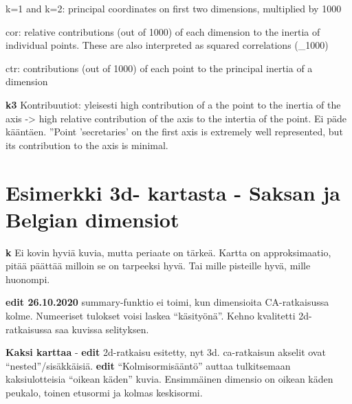 \documentclass[
  finnish,
]{book}
\newenvironment{Shaded}{\begin{snugshade}}{\end{snugshade}}
\newcommand{\CommentTok}[1]{\textcolor[rgb]{0.56,0.35,0.01}{\textit{#1}}}
\newcommand{\DataTypeTok}[1]{\textcolor[rgb]{0.13,0.29,0.53}{#1}}
\newcommand{\DecValTok}[1]{\textcolor[rgb]{0.00,0.00,0.81}{#1}}
\newcommand{\KeywordTok}[1]{\textcolor[rgb]{0.13,0.29,0.53}{\textbf{#1}}}
\newcommand{\NormalTok}[1]{#1}
\newcommand{\OperatorTok}[1]{\textcolor[rgb]{0.81,0.36,0.00}{\textbf{#1}}}
\newcommand{\StringTok}[1]{\textcolor[rgb]{0.31,0.60,0.02}{#1}}
\begin{document}
k=1 and k=2: principal coordinates on first two dimensions, multiplied by 1000

cor: relative contributions (out of 1000) of each dimension to the inertia of
individual points. These are also interpreted as squared correlations (\_1000)

ctr: contributions (out of 1000) of each point to the principal inertia of a dimension

\textbf{k3} Kontribuutiot: yleisesti high contribution of a the point to the inertia of the
axis -\textgreater{} high relative contribution of the axis to the intertia of the point.
Ei päde kääntäen. ''Point 'secretaries' on the first axis is extremely
well represented, but its contribution to the axis is minimal.

\hypertarget{esimerkki-3d--kartasta---saksan-ja-belgian-dimensiot}{%
\section{Esimerkki 3d- kartasta - Saksan ja Belgian dimensiot}\label{esimerkki-3d--kartasta---saksan-ja-belgian-dimensiot}}

\textbf{k} Ei kovin hyviä kuvia, mutta periaate on tärkeä. Kartta on approksimaatio,
pitää päättää milloin se on tarpeeksi hyvä. Tai mille pisteille hyvä, mille huonompi.

\textbf{edit 26.10.2020} summary-funktio ei toimi, kun dimensioita CA-ratkaisussa kolme.
Numeeriset tulokset voisi laskea ``käsityönä''. Kehno kvalitetti 2d-ratkaisussa saa
kuvissa selityksen.

\begin{Shaded}
\end{Shaded}

\textbf{Kaksi karttaa} - \textbf{edit} 2d-ratkaisu esitetty, nyt 3d. ca-ratkaisun akselit ovat ``nested''/sisäkkäisiä.
\textbf{edit} ``Kolmisormisääntö'' auttaa tulkitsemaan kaksiulotteisia ``oikean käden''
kuvia. Ensimmäinen dimensio on oikean käden peukalo, toinen etusormi ja kolmas
keskisormi.
\end{document}
